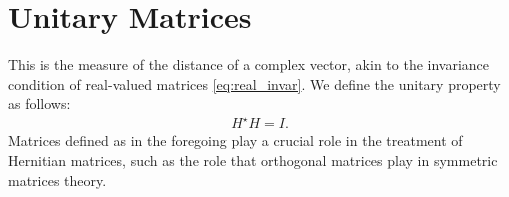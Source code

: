 \section{Unitary Matrices}

This is the measure of the distance of a complex vector, akin to the invariance condition of real-valued matrices \eqref{eq:real_invar}. We define the unitary property as follows:
%
\begin{align}
	H^\star H = I.
\end{align}
%
Matrices defined as in the foregoing play a crucial role in the treatment of Hernitian matrices, such as the role that orthogonal matrices play in symmetric matrices theory.
